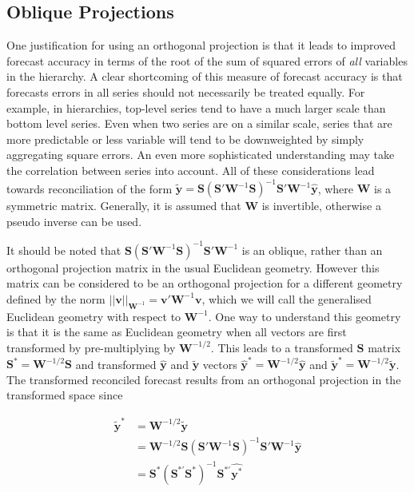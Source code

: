 \documentclass[12pt]{article}
\theoremstyle{definition}
\theoremstyle{property}
\begin{document}
	\subsection{Oblique Projections}\label{sec:oblique}
	
	One justification for using an orthogonal projection is that it leads to improved forecast accuracy in terms of the root of the sum of squared errors of {\em all} variables in the hierarchy.  A clear shortcoming of this measure of forecast accuracy is that forecasts errors in all series should not necessarily be treated equally.  For example, in hierarchies, top-level series tend to have a much larger scale than bottom level series.  Even when two series are on a similar scale, series that are more predictable or less variable will tend to be downweighted by simply aggregating square errors.  An even more sophisticated understanding may take the correlation between series into account.  All of these considerations lead towards reconciliation of the form $\tilde{\bm{y}}=\bm{S}\left(\bm{S}'\bm{W}^{-1}\bm{S}\right)^{-1}\bm{S}'\bm{W}^{-1}\hat{\bm{y}}$, where $\bm{W}$ is a symmetric matrix.  Generally, it is assumed that $\bm{W}$ is invertible, otherwise a pseudo inverse can be used.
	
	It should be noted that  $\bm{S}\left(\bm{S}'\bm{W}^{-1}\bm{S}\right)^{-1}\bm{S}'\bm{W}^{-1}$ is an oblique, rather than an orthogonal projection matrix in the usual Euclidean geometry.  However this matrix can be considered to be an orthogonal projection for a different geometry defined by the norm $||\bm{v}||_{{\bm W}^{-1}}=\bm{v}'\bm{W}^{-1}\bm{v}$, which we will call the generalised Euclidean geometry with respect to $\bm{W}^{-1}$.  One way to understand this geometry is that it is the same as Euclidean geometry when all vectors are first transformed by pre-multiplying by $\bm{W}^{-1/2}$.  This leads to a transformed $\bm{S}$ matrix $\bm{S}^*=\bm{W}^{-1/2}\bm{S}$ and transformed $\hat{\bm{y}}$ and $\tilde{\bm{y}}$ vectors $\hat{\bm{y}}^*=\bm{W}^{-1/2}\hat{\bm{y}}$ and $\tilde{\bm{y}}^*=\bm{W}^{-1/2}\tilde{\bm{y}}$.  The transformed reconciled forecast results from an orthogonal projection in the transformed space since 
	
	\begin{align}
	\tilde{\bm{y}}^*&=\bm{W}^{-1/2}\tilde{\bm{y}}\\&=\bm{W}^{-1/2}\bm{S}\left(\bm{S}'\bm{W}^{-1}\bm{S}\right)^{-1}\bm{S}'\bm{W}^{-1}\hat{\bm{y}}
	\\&=\bm{S}^*\left(\bm{S}^{*'}\bm{S}^*\right)^{-1}\bm{S}^{*'}\hat{\bm{y}^*}
	\end{align}
	
\end{document}
